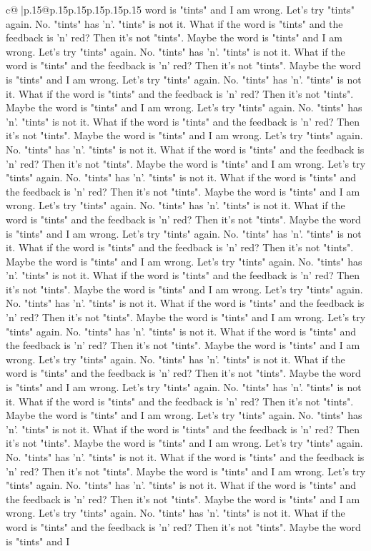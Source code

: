 \documentclass{article}
\begin{document}
{\begin{supertabular}{c@{$\;$}|p{.15\linewidth}@{}p{.15\linewidth}p{.15\linewidth}p{.15\linewidth}p{.15\linewidth}p{.15\linewidth}}
{{{word is "tints" and I am wrong. Let's try "tints" again. No. "tints" has 'n'. "tints" is not it. What if the word is "tints" and the feedback is 'n' red? Then it's not "tints". Maybe the word is "tints" and I am wrong. Let's try "tints" again. No. "tints" has 'n'. "tints" is not it. What if the word is "tints" and the feedback is 'n' red? Then it's not "tints". Maybe the word is "tints" and I am wrong. Let's try "tints" again. No. "tints" has 'n'. "tints" is not it. What if the word is "tints" and the feedback is 'n' red? Then it's not "tints". Maybe the word is "tints" and I am wrong. Let's try "tints" again. No. "tints" has 'n'. "tints" is not it. What if the word is "tints" and the feedback is 'n' red? Then it's not "tints". Maybe the word is "tints" and I am wrong. Let's try "tints" again. No. "tints" has 'n'. "tints" is not it. What if the word is "tints" and the feedback is 'n' red? Then it's not "tints". Maybe the word is "tints" and I am wrong. Let's try "tints" again. No. "tints" has 'n'. "tints" is not it. What if the word is "tints" and the feedback is 'n' red? Then it's not "tints". Maybe the word is "tints" and I am wrong. Let's try "tints" again. No. "tints" has 'n'. "tints" is not it. What if the word is "tints" and the feedback is 'n' red? Then it's not "tints". Maybe the word is "tints" and I am wrong. Let's try "tints" again. No. "tints" has 'n'. "tints" is not it. What if the word is "tints" and the feedback is 'n' red? Then it's not "tints". Maybe the word is "tints" and I am wrong. Let's try "tints" again. No. "tints" has 'n'. "tints" is not it. What if the word is "tints" and the feedback is 'n' red? Then it's not "tints". Maybe the word is "tints" and I am wrong. Let's try "tints" again. No. "tints" has 'n'. "tints" is not it. What if the word is "tints" and the feedback is 'n' red? Then it's not "tints". Maybe the word is "tints" and I am wrong. Let's try "tints" again. No. "tints" has 'n'. "tints" is not it. What if the word is "tints" and the feedback is 'n' red? Then it's not "tints". Maybe the word is "tints" and I am wrong. Let's try "tints" again. No. "tints" has 'n'. "tints" is not it. What if the word is "tints" and the feedback is 'n' red? Then it's not "tints". Maybe the word is "tints" and I am wrong. Let's try "tints" again. No. "tints" has 'n'. "tints" is not it. What if the word is "tints" and the feedback is 'n' red? Then it's not "tints". Maybe the word is "tints" and I am wrong. Let's try "tints" again. No. "tints" has 'n'. "tints" is not it. What if the word is "tints" and the feedback is 'n' red? Then it's not "tints". Maybe the word is "tints" and I am wrong. Let's try "tints" again. No. "tints" has 'n'. "tints" is not it. What if the word is "tints" and the feedback is 'n' red? Then it's not "tints". Maybe the word is "tints" and I am wrong. Let's try "tints" again. No. "tints" has 'n'. "tints" is not it. What if the word is "tints" and the feedback is 'n' red? Then it's not "tints". Maybe the word is "tints" and I am wrong. Let's try "tints" again. No. "tints" has 'n'. "tints" is not it. What if the word is "tints" and the feedback is 'n' red? Then it's not "tints". Maybe the word is "tints" and I }}}
\end{supertabular}}
\end{document}
